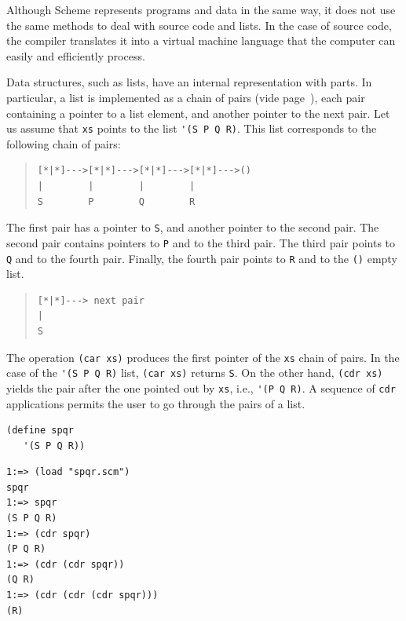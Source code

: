 \documentclass[a4paper,12pt]{book}
\newenvironment{fmpage}[1]
           {\begin{lrbox}{\fmbox}\begin{minipage}{#1}}
           {\end{minipage}\end{lrbox}\fbox{\usebox{\fmbox}}}
\begin{document}
Although Scheme represents programs and
data in the same way, it does not use
the same methods to deal with source
code and lists. In the case of source
code, the compiler translates it into
a virtual machine language that the
computer can easily and efficiently
process.

Data structures, such as lists, have
an internal representation with parts. 
In particular, a list is implemented
as a chain of pairs 
(vide page~\pageref{page:cartesian-pair}),
each pair containing
a pointer to a list element,
and another pointer to the next pair. 
Let us assume that
\verb|xs| points to the list
\verb|'(S P Q R)|.
This list corresponds to the following
chain of pairs:
\begin{quote}
\begin{verbatim}
[*|*]--->[*|*]--->[*|*]--->[*|*]--->()
|        |        |        |        
S        P        Q        R       
\end{verbatim}
\end{quote}
The first pair has a pointer to \verb|S|,
and another pointer to the second pair.
The second pair contains pointers to 
\verb|P| and to the third pair. 
The third pair points to \verb|Q| and
to the fourth pair. Finally, the fourth
pair points to \verb|R| and to 
the \verb|()| empty list.

\begin{quote}
\begin{verbatim}
[*|*]---> next pair
|        
S      
\end{verbatim}
\end{quote}
The operation \verb|(car xs)| produces
the first pointer of the \verb|xs| 
chain of pairs. In the case of
the \verb|'(S P Q R)| list, \verb|(car xs)|
returns \verb|S|. On the other hand,
\verb|(cdr xs)| yields the pair
after the one pointed out by \verb|xs|,
i.e., \verb|'(P Q R)|. A sequence
of \verb|cdr| applications permits the user to
go through the pairs of a list. \\

\begin{fmpage}{0.8\linewidth}
\begin{verbatim}
(define spqr
   '(S P Q R))
\end{verbatim}
\end{fmpage}

\begin{fmpage}{0.8\linewidth}
\begin{verbatim}
1:=> (load "spqr.scm")
spqr
1:=> spqr
(S P Q R)
1:=> (cdr spqr)
(P Q R)
1:=> (cdr (cdr spqr))
(Q R)
1:=> (cdr (cdr (cdr spqr)))
(R)
\end{verbatim}
\end{fmpage}
\end{document}
